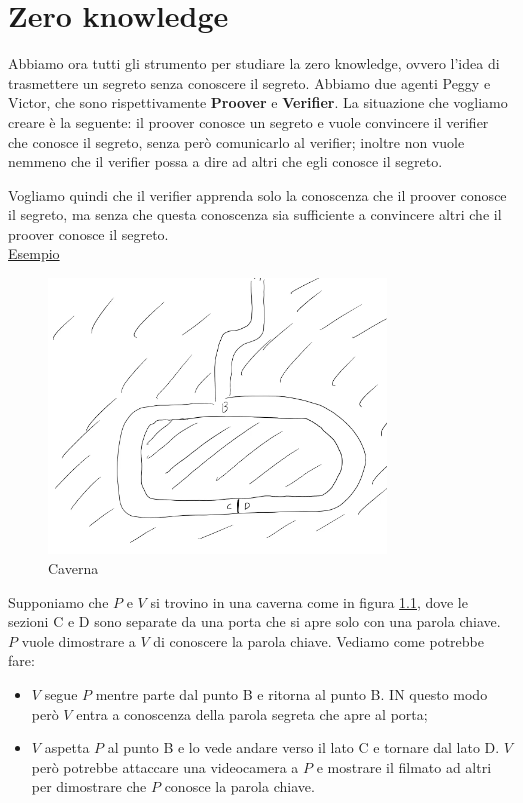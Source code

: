 \setchapterpreamble[u]{\margintoc}
\chapter{Zero knowledge}


Abbiamo ora tutti gli strumento per studiare la zero knowledge, ovvero l'idea di trasmettere un segreto senza conoscere il segreto. Abbiamo due agenti Peggy e Victor, che sono rispettivamente \textbf{Proover} e \textbf{Verifier}. La situazione che vogliamo creare è la seguente: il proover conosce un segreto e vuole convincere il verifier che conosce il segreto, senza però comunicarlo al verifier; inoltre non vuole nemmeno che il verifier possa a dire ad altri che egli conosce il segreto.

Vogliamo quindi che il verifier apprenda solo la conoscenza che il proover conosce il segreto, ma senza che questa conoscenza sia sufficiente a convincere altri che il proover conosce il segreto. 
\\

\noindent \underline{Esempio}
\\
\begin{figure}
    \centering
    \includegraphics[width=0.8\textwidth]{images/13-1.png}
    \caption{Caverna}
    \label{fig:13-1}
\end{figure}

\noindent Supponiamo che $P$ e $V$ si trovino in una caverna come in figura \ref{fig:13-1}, dove le sezioni C e D sono separate da una porta che si apre solo con una parola chiave. $P$ vuole dimostrare a $V$ di conoscere la parola chiave. Vediamo come potrebbe fare:
\begin{itemize}
    \item $V$ segue $P$ mentre parte dal punto B e ritorna al punto B. IN questo modo però $V$ entra a conoscenza della parola segreta che apre al porta;
    \item $V$ aspetta $P$ al punto B e lo vede andare verso il lato C e tornare dal lato D. $V$ però potrebbe attaccare una videocamera a $P$ e mostrare il filmato ad altri per dimostrare che $P$ conosce la parola chiave.
\end{itemize}

